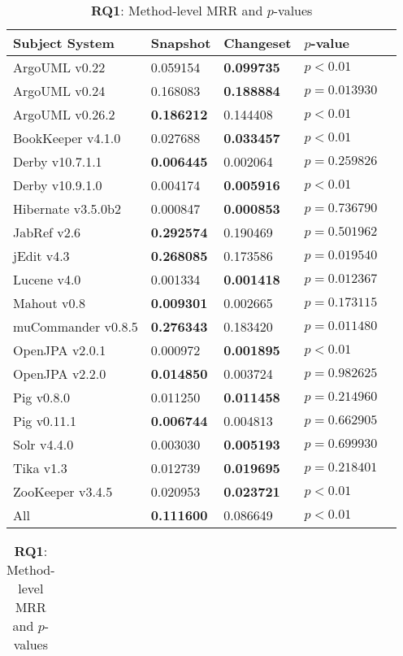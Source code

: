 \begin{table}[t]
\renewcommand{\arraystretch}{1.3}
\footnotesize
\centering
\caption{{\bf RQ1}: Class-level MRR and $p$-values}
\begin{tabular}{l|ll|ll}
\toprule
Subject System & Snapshot & Changeset & $p$-value  \\
\midrule
ArgoUML v0.22 & 0.059154 & {\bf 0.099735 } & $p < 0.01$ \\
ArgoUML v0.24 & 0.168083 & {\bf 0.188884 } & $p = 0.013930$ \\
ArgoUML v0.26.2 & {\bf 0.186212 } & 0.144408 & $p < 0.01$ \\
BookKeeper v4.1.0 & 0.027688 & {\bf 0.033457 } & $p < 0.01$ \\
Derby v10.7.1.1 & {\bf 0.006445 } & 0.002064 & $p = 0.259826$ \\
Derby v10.9.1.0 & 0.004174 & {\bf 0.005916 } & $p < 0.01$ \\
Hibernate v3.5.0b2 & 0.000847 & {\bf 0.000853 } & $p = 0.736790$ \\
JabRef v2.6 & {\bf 0.292574 } & 0.190469 & $p = 0.501962$ \\
jEdit v4.3 & {\bf 0.268085 } & 0.173586 & $p = 0.019540$ \\
Lucene v4.0 & 0.001334 & {\bf 0.001418 } & $p = 0.012367$ \\
Mahout v0.8 & {\bf 0.009301 } & 0.002665 & $p = 0.173115$ \\
muCommander v0.8.5 & {\bf 0.276343 } & 0.183420 & $p = 0.011480$ \\
OpenJPA v2.0.1 & 0.000972 & {\bf 0.001895 } & $p < 0.01$ \\
OpenJPA v2.2.0 & {\bf 0.014850 } & 0.003724 & $p = 0.982625$ \\
Pig v0.8.0 & 0.011250 & {\bf 0.011458 } & $p = 0.214960$ \\
Pig v0.11.1 & {\bf 0.006744 } & 0.004813 & $p = 0.662905$ \\
Solr v4.4.0 & 0.003030 & {\bf 0.005193 } & $p = 0.699930$ \\
Tika v1.3 & 0.012739 & {\bf 0.019695 } & $p = 0.218401$ \\
ZooKeeper v3.4.5 & 0.020953 & {\bf 0.023721 } & $p < 0.01$ \\
\midrule
All & {\bf 0.111600 } & 0.086649 & $p < 0.01$ \\
\bottomrule
\end{tabular}
\label{table:rq1:class:lda}
\caption{{\bf RQ1}: Method-level MRR and $p$-values}
\begin{tabular}{l|ll|ll}
\toprule

\end{tabular}
\end{table}
